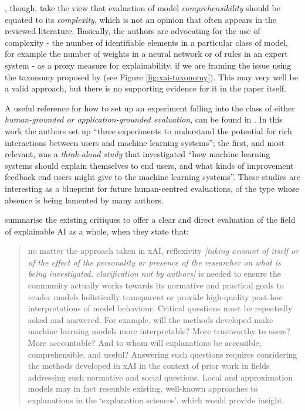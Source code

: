 \citet{guidotti2018survey}, though, take the view that evaluation of model \textit{comprehensibility} should be equated to its \textit{complexity}, which is not an opinion that often appears in the reviewed literature.
Basically, the authors are advocating for the use of complexity - the number of identifiable elements in a particular class of model, for example the number of weights in a neural network or of rules in an expert system - as a proxy measure for explainability, if we are framing the issue using the taxonomy proposed by \citet{doshi2017towards} (see Figure \ref{fig:xai-taxonomy}).
This may very well be a valid approach, but there is no supporting evidence for it in the paper itself.

A useful reference for how to set up an experiment falling into the class of either \textit{human-grounded or application-grounded evaluation}, can be found in \citet{stumpf2009interacting}.
In this work the authors set up \enquote{three experiments to understand the potential for rich interactions between users and machine learning systems}; the first, and most relevant, was a \textit{think-aloud study} that investigated \enquote{how machine learning systems should explain themselves to end users, and what kinds of improvement feedback end users might give to the machine learning systems}.
These studies are interesting as a blueprint for future human-centred evaluations, of the type whose absence is being lamented by many authors.

\citet{mittelstadt2019explaining} summarise the existing critiques to offer a clear and direct evaluation of the field of explainable AI as a whole, when they state that:
\begin{quotation}
	no matter the approach taken in xAI, reflexivity \textit{[taking account of itself or of the effect of the personality or presence of the researcher on what is being investigated, clarification not by authors]} is needed to ensure the community actually works towards its normative and practical goals to render models holistically transparent or provide high-quality post-hoc interpretations of model behaviour. Critical questions must be repeatedly asked and answered. For example, will the methods developed make machine learning models more interpretable? More trustworthy to users? More accountable? And to whom will explanations be accessible, comprehensible, and useful? Answering such questions requires considering the methods developed in xAI in the context of prior work in fields addressing such normative and social questions. Local and approximation models may in fact resemble existing, well-known approaches to explanations in the `explanation sciences', which would provide insight.
	
	\hfill \citet[pag. 3]{mittelstadt2019explaining}
\end{quotation}

